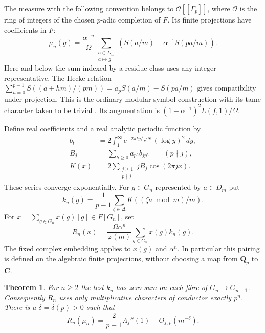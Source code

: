 \documentclass[11pt]{article}
\newtheorem{theorem}{Theorem}[section]
\newcommand{\Q}{\mathbf Q}
\newcommand{\C}{\mathbf C}
\begin{document}
The measure with the following convention belongs to
\(\mathcal O[[\Gamma_p]]\), where \(\mathcal O\) is the ring of integers
of the chosen \(p\)-adic completion of \(F\). Its finite projections have
coefficients in \(F\):
\begin{equation}\label{eq:measure}
 \mu_n(g)=\frac{\alpha^{-n}}{\Omega}
   \sum_{\substack{a\in D_m\\ a\mapsto g}}
       \left(S(a/m)-\alpha^{-1}S(pa/m)\right).
\end{equation}
Here and below the sum indexed by a residue class uses any integer
representative. The Hecke relation
\(\sum_{h=0}^{p-1}S((a+hm)/(pm))=a_pS(a/m)-S(pa/m)\)
gives compatibility under projection. This is the ordinary modular-symbol
construction with its tame character taken to be trivial
\cite{mtt}. Its augmentation is
\((1-\alpha^{-1})^2 L(f,1)/\Omega\).

Define real coefficients and a real analytic periodic function by
\begin{align}
 b_t&=2\int_1^\infty e^{-2\pi t y/\sqrt N}(\log y)^2\,dy,\nonumber\\
 B_j&=\sum_{h\ge0}a_{p^h} b_{jp^h} \qquad (p\nmid j),\nonumber\\
 K(x)&=2\sum_{\substack{j\ge1\\p\nmid j}}j B_j\cos(2\pi j x).
 \label{eq:kernel}
\end{align}
These series converge exponentially. For \(g\in G_n\) represented by
\(a\in D_m\) put
\[
 k_n(g)=\frac{1}{p-1}\sum_{\zeta\in\Delta}K((\zeta a\bmod m)/m).
\]
For \(x=\sum_{g\in G_n}x(g)[g]\in F[G_n]\), set
\begin{equation}\label{eq:pairing}
 R_n(x)=\frac{\Omega\alpha^n}{\varphi(m)}
            \sum_{g\in G_n} x(g)k_n(g).
\end{equation}
The fixed complex embedding applies to \(x(g)\) and \(\alpha^n\).
In particular this pairing is defined on the algebraic finite
projections, without choosing a map from \(\Q_p\) to \(\C\).

\begin{theorem}\label{thm:reconstruct}
For \(n\ge2\) the test \(k_n\) has zero sum on each fibre of
\(G_n\to G_{n-1}\). Consequently \(R_n\) uses only multiplicative
characters of conductor exactly \(p^n\). There is a
\(\delta=\delta(p)>0\) such that
\begin{equation}\label{eq:limit}
 R_n(\mu_n)=\frac{2}{p-1}\Lambda_f''(1)+O_{f,p}(m^{-\delta}).
\end{equation}
\end{theorem}
\end{document}
